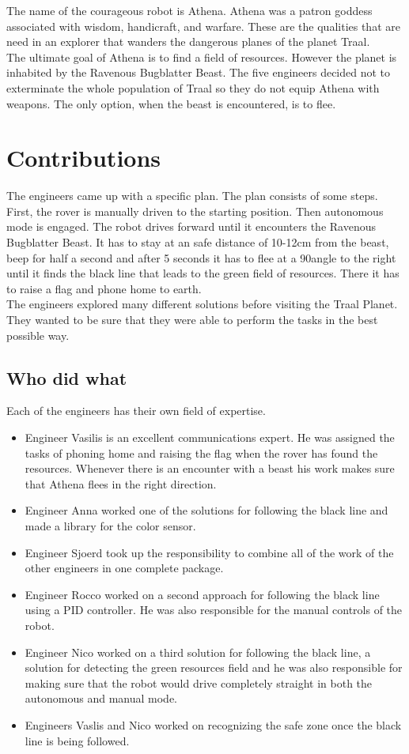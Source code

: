 \documentclass[a4paper,12pt]{article}
\begin{document}
\noindent The name of the courageous robot is Athena. Athena was a patron goddess associated with wisdom, handicraft, and warfare. These are the qualities that are need in an explorer that wanders the dangerous planes of the planet Traal.\\

\noindent The ultimate goal of Athena is to find a field of resources. However the planet is inhabited by the Ravenous Bugblatter Beast. The five engineers decided not to exterminate the whole population of Traal so they do not equip Athena with weapons. The only option, when the beast is encountered, is to flee.

\section{Contributions}
The engineers came up with a specific plan. The plan consists of some steps. First, the rover is manually driven to the starting position. Then autonomous mode is engaged. The robot drives forward until it encounters the Ravenous Bugblatter Beast. It has to stay at an safe distance of 10-12cm from the beast, beep for half a second and after 5 seconds it has to flee at a 90\degree angle to the right until it finds the black line that leads to the green field of resources. There it has to raise a flag and phone home to earth.\\

\noindent The engineers explored many different solutions before visiting the Traal Planet. They wanted to be sure that they were able to perform the tasks in the best possible way.
\subsection{Who did what}
Each of the engineers has their own field of expertise.\\
\begin{itemize}
    \item Engineer Vasilis is an excellent communications expert. He was assigned the tasks of phoning home and raising the flag when the rover has found the resources. Whenever there is an encounter with a beast his work makes sure that Athena flees in the right direction.
    \item Engineer Anna worked one of the solutions for following the black line and made a library for the color sensor.
    \item Engineer Sjoerd took up the responsibility to combine all of the work of the other engineers in one complete package.
    \item Engineer Rocco worked on a second approach for following the black line using a PID controller. He was also responsible for the manual controls of the robot.
    \item Engineer Nico worked on a third solution for following the black line, a solution for detecting the green resources field and he was also responsible for making sure that the robot would drive completely straight in both the autonomous and manual mode.
    \item Engineers Vaslis and Nico worked on recognizing the safe zone once the black line is being followed.
\end{itemize}
\end{document}

